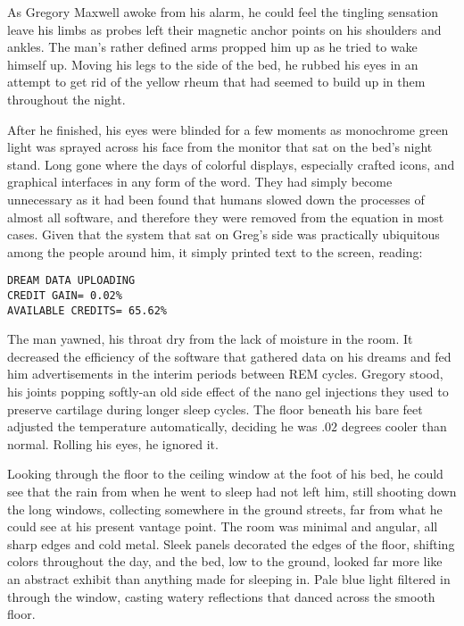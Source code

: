 As Gregory Maxwell awoke from his alarm, he could feel the tingling sensation leave his limbs as probes left their magnetic anchor points on his shoulders and ankles.
The man’s rather defined arms propped him up as he tried to wake himself up.
Moving his legs to the side of the bed, he rubbed his eyes in an attempt to get rid of the yellow rheum that had seemed to build up in them throughout the night.

After he finished, his eyes were blinded for a few moments as monochrome green light was sprayed across his face from the monitor that sat on the bed’s night stand.
Long gone where the days of colorful displays, especially crafted icons, and graphical interfaces in any form of the word.
They had simply become unnecessary as it had been found that humans slowed down the processes of almost all software, and therefore they were removed from the equation in most cases.
Given that the system that sat on Greg’s side was practically ubiquitous among the people around him, it simply printed text to the screen, reading:
\begin{center}
\verb|DREAM DATA UPLOADING|\\
\verb|CREDIT GAIN= 0.02%|\\
\verb|AVAILABLE CREDITS= 65.62%|
\end{center}
The man yawned, his throat dry from the lack of moisture in the room.
It decreased the efficiency of the software that gathered data on his dreams and fed him advertisements in the interim periods between REM cycles.
Gregory stood, his joints popping softly-an old side effect of the nano gel injections they used to preserve cartilage during longer sleep cycles.
The floor beneath his bare feet adjusted the temperature automatically, deciding he was $.02$ degrees cooler than normal.
Rolling his eyes, he ignored it.

Looking through the floor to the ceiling window at the foot of his bed, he could see that the rain from when he went to sleep
had not left him, still shooting down the long windows, collecting somewhere in the ground streets, far from what he could see at his present vantage point.
The room was minimal and angular, all sharp edges and cold metal.
Sleek panels decorated the edges of the floor, shifting colors throughout the day, and the bed, low to the ground, looked far more like an abstract exhibit than anything made for sleeping in.
Pale blue light filtered in through the window, casting watery reflections that danced across the smooth floor.

